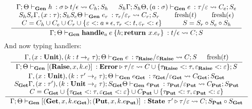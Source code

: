 \documentclass[declaration,shortabstract]{iithesis}
\theoremstyle{definition} \newtheorem{definition}{Definition}[section]
\newcommand{\gens}[6][\Gamma;\Theta]{\ensuremath{{{#1} \vdash_\textbf{Gen} {#2} \: : {#3}/{#4}} \rightsquigarrow {#5};{#6}}}
\newcommand{\arrow}[3]{{#1}\rightarrow_{#2}{#3}}
\newcommand{\fresh}[1]{\ensuremath{\operatorname{fresh}({#1})}}
\begin{document}
\begin{gather*}
\begin{gathered}
\\
\inference{
\gens{h}{\sigma \triangleright t}{\epsilon}{C_h}{S_h} &
\gens[S_h\Gamma; S_h\Theta, (a:\sigma)]{e}{\tau}{\varepsilon}{C_e}{S_e} \\
\gens[S_h S_e \Gamma,(x:\tau); S_h S_e \Theta]{e_r}{\tau_r}{\varepsilon_r}{C_r}{S_r} & 
\fresh{t} & \fresh{\epsilon} \\
C = C_h \cup C_e \cup C_r \cup\{\varepsilon <: a * \epsilon, \tau_r <: t, \varepsilon_r <: \epsilon \} &
S = S_r \circ S_e \circ S_h
}{
\gens{\textbf{handle}_a \: e\: \{h;\textbf{return } x. e_r\}}{t}{\epsilon}{C}{S}
}
\end{gathered}
\end{gather*}
And now typing handlers:
\begin{gather*}
\begin{gathered}
\inference{ 
\gens[\Gamma,(x:\textbf{Unit}), (k:\arrow{t}{\varepsilon}{\tau});\Theta]{e}{\tau_\textbf{Raise}}{\varepsilon_\textbf{Raise}}{C}{S} &
\fresh{t}
}{
\gens{ [(\textbf{Raise}, x, k. e)]}{\textbf{Error}\triangleright \tau}{\varepsilon}{C\cup\{\tau_\textbf{Raise} <: \tau, \varepsilon_\textbf{Raise} <: \varepsilon\}}{S}
}
\\
\inference{
\gens[\Gamma,(x:\textbf{Unit}), (k:\arrow{\tau'}{\varepsilon}{\tau});\Theta] 
{e_\textbf{Get}}{\tau_\textbf{Get}}{\varepsilon_\textbf{Get}}{C_\textbf{Get}}{S_\textbf{Get}}
\\
\gens[S_\textbf{Get}\Gamma,(x:\tau'), (k:\arrow{\textbf{Unit}}{\varepsilon}{\tau});S_\textbf{Get} \Theta]
{e_\textbf{Put}}{\tau_\textbf{Put}}{\varepsilon_\textbf{Put}}{C_\textbf{Put}}{S_\textbf{Put}} \\
C = C_\textbf{Get} \cup \{ \tau_\textbf{Get} <: \tau,  \varepsilon_\textbf{Get} <: \varepsilon \}
\cup C_\textbf{Put} \cup \{ \tau_\textbf{Put} <: \tau,  \varepsilon_\textbf{Put} <: \varepsilon \}
}{
\gens{ [(\textbf{Get}, x, k. e_\textbf{Get});(\textbf{Put}, x, k. e_\textbf{Put})]}{\textbf{State }\tau'\triangleright \tau}{\varepsilon}{C}{S_\textbf{Put} \circ S_\textbf{Get}}
}
\end{gathered}
\end{gather*}
\setlength{\jot}{3pt}

\end{document}
